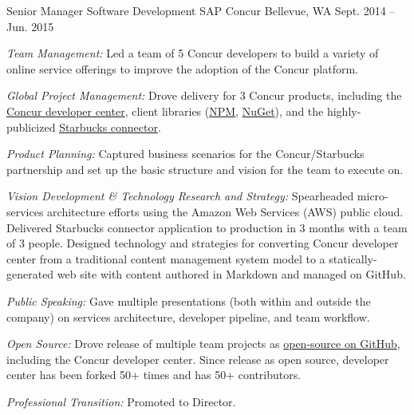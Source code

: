 \begin{cventries}


\cventry
{Senior Manager Software Development}
{SAP Concur}
{Bellevue, WA}
{Sept. 2014 – Jun. 2015}
{ %
\begin{cvitems}
\item {\emph{Team Management:} Led a team of 5 Concur developers to build a variety of online service offerings to improve the adoption of the Concur platform.}
\item {\emph{Global Project Management:} Drove delivery for 3 Concur products, including the \href{https://developer.concur.com}{Concur developer center}, client libraries (\href{https://www.npmjs.com/package/concur}{NPM}, \href{https://www.nuget.org/packages/ConcurPlatform/}{NuGet}), and the highly-publicized \href{http://www.bloomberg.com/news/videos/2015-02-23/concur-taking-the-pain-out-of-expense-reports}{Starbucks connector}.}
\item {\emph{Product Planning:} Captured business scenarios for the Concur/Starbucks partnership and set up the basic structure and vision for the team to execute on.}
\item {\emph{Vision Development \& Technology Research and Strategy:} Spearheaded micro-services architecture efforts using the Amazon Web Services (AWS) public cloud. Delivered Starbucks connector application to production in 3 months with a team of 3 people. Designed technology and strategies for converting Concur developer center from a traditional content management system model to a statically-generated web site with content authored in Markdown and managed on GitHub.}
\item {\emph{Public Speaking:} Gave multiple presentations (both within and outside the company) on services architecture, developer pipeline, and team workflow.}
\item {\emph{Open Source:} Drove release of multiple team projects as \href{https://github.com/concur}{open-source on GitHub}, including the Concur developer center. Since release as open source, developer center has been forked 50+ times and has 50+ contributors.}
\item {\emph{Professional Transition:} Promoted to Director.}
\end{cvitems}
}



\end{cventries}
